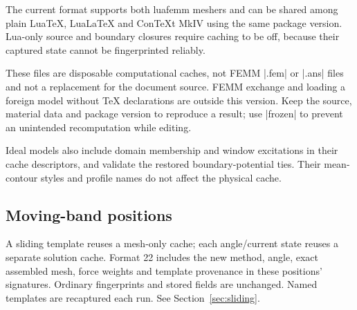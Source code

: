 The current format supports both luafemm meshers and can be shared among
plain LuaTeX, LuaLaTeX and ConTeXt MkIV using the same package version.
Lua-only source and boundary closures require caching to be off, because
their captured state cannot be fingerprinted reliably.

These files are disposable computational caches, not FEMM |.fem| or |.ans|
files and not a replacement for the document source. FEMM exchange and
loading a foreign model without TeX declarations are outside this version.
Keep the source, material data and package version to reproduce a result;
use |frozen| to prevent an unintended recomputation while editing.

Ideal models also include domain membership and window excitations in their
cache descriptors, and validate the restored boundary-potential ties.
Their mean-contour styles and profile names do not affect the physical cache.

\subsection{Moving-band positions}
A sliding template reuses a mesh-only cache; each angle/current state reuses a
separate solution cache. Format 22 includes the new method, angle, exact assembled
mesh, force weights and template provenance in these positions' signatures.
Ordinary fingerprints and stored fields are unchanged. Named templates are
recaptured each run. See Section~\ref{sec:sliding}.
